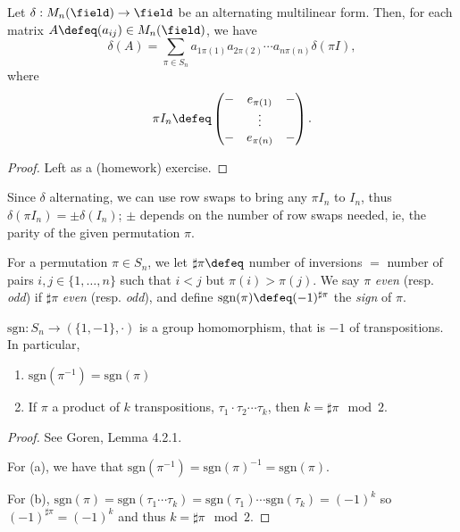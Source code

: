 \begin{proposition}\label{prop:alternatingmultilinearpermutations}
    Let $\delta : M_n{(\field)} \to \field$ be an alternating multilinear form. Then, for each matrix $A \defeq (a_{ij}) \in M_n(\field)$, we have \[
    \delta(A)     = \sum_{ \pi \in S_n}a_{1 \pi(1)}a_{2 \pi(2)}\cdots a_{n\pi(n)} \delta(\pi I),
    \]
    where \[
    \pi I_n \defeq \begin{pmatrix}
        - & e_{\pi(1)} & -\\
        & \vdots & \\
        - & e_{\pi(n)} & -
    \end{pmatrix}.
    \]
\end{proposition}
\begin{proof}
    Left as a (homework) exercise.
\end{proof}
\begin{remark}
    Since $\delta$ alternating, we can use row swaps to bring any $\pi I_n$ to $I_n$, thus $\delta(\pi I_n) = \pm \delta(I_n)$; $\pm$ depends on the number of row swaps needed, ie, the parity of the given permutation $\pi$.
\end{remark}

\begin{definition}[Parity]
    For a permutation $\pi \in S_n$, we let $\sharp \pi \defeq $ number of inversions $ = $ number of pairs $i, j\in \{1, \dots, n\}$ such that $i < j$ but $\pi(i) > \pi(j)$. We say $\pi$ \emph{even} (resp. \emph{odd}) if $\sharp\pi$ \emph{even} (resp. \emph{odd}), and define $\text{sgn}(\pi) \defeq (-1)^{\sharp \pi}$ the \emph{sign} of $\pi$.
\end{definition}

\begin{proposition}
    $\text{sgn} : S_n \to (\{1, -1\}, \cdot)$ is a group homomorphism, that is $-1$ of transpositions. In particular, \begin{enumerate}
        \item $\text{sgn}(\pi^{-1}) = \text{sgn}(\pi)$
        \item If $\pi$ a product of $k$ transpositions, $\tau_1 \cdot \tau_2 \cdots \tau_k$, then $k = \sharp \pi \mod 2$.
    \end{enumerate}
\end{proposition}

\begin{proof}
    See Goren, Lemma 4.2.1. 
    
    For (a), we have that $\text{sgn}(\pi^{-1}) = \text{sgn}(\pi)^{-1} = \text{sgn}(\pi)$.

    For (b), $\text{sgn}(\pi) = \text{sgn}(\tau_1 \cdots \tau_k) = \text{sgn}(\tau_1) \cdots \text{sgn}(\tau_k) = (-1)^k$ so $(-1)^{\sharp \pi} = (-1)^k$ and thus $k = \sharp \pi \mod 2$.
\end{proof}

